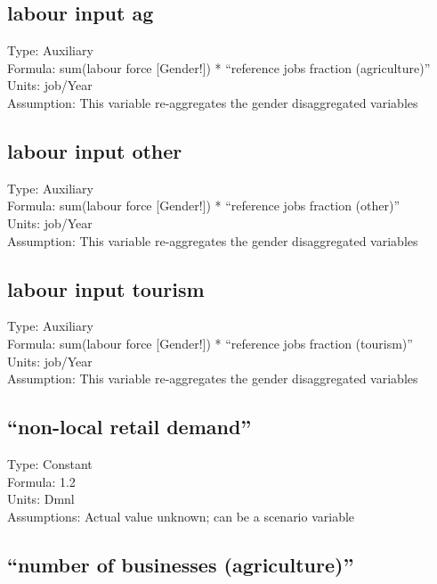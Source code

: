 \documentclass[
  11pt,
]{book}
\begin{document}
\hypertarget{labour-input-ag}{%
\subsection{labour input ag}\label{labour-input-ag}}

Type: Auxiliary\\
Formula: sum(labour force {[}Gender!{]}) * ``reference jobs fraction (agriculture)''\\
Units: job/Year\\
Assumption: This variable re-aggregates the gender disaggregated variables

\hypertarget{labour-input-other}{%
\subsection{labour input other}\label{labour-input-other}}

Type: Auxiliary\\
Formula: sum(labour force {[}Gender!{]}) * ``reference jobs fraction (other)''\\
Units: job/Year\\
Assumption: This variable re-aggregates the gender disaggregated variables

\hypertarget{labour-input-tourism}{%
\subsection{labour input tourism}\label{labour-input-tourism}}

Type: Auxiliary\\
Formula: sum(labour force {[}Gender!{]}) * ``reference jobs fraction (tourism)''\\
Units: job/Year\\
Assumption: This variable re-aggregates the gender disaggregated variables

\hypertarget{non-local-retail-demand}{%
\subsection{``non-local retail demand''}\label{non-local-retail-demand}}

Type: Constant\\
Formula: 1.2\\
Units: Dmnl\\
Assumptions: Actual value unknown; can be a scenario variable

\hypertarget{number-of-businesses-agriculture}{%
\subsection{``number of businesses (agriculture)''}\label{number-of-businesses-agriculture}}
\end{document}
